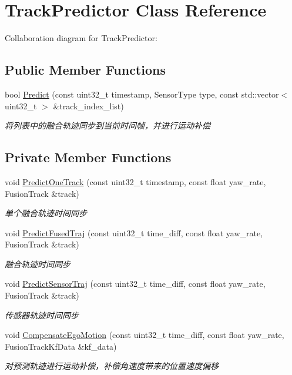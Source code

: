 \hypertarget{classTrackPredictor}{}\section{Track\+Predictor Class Reference}
\label{classTrackPredictor}


Collaboration diagram for Track\+Predictor\+:
\subsection*{Public Member Functions}
\begin{DoxyCompactItemize}
\item 
bool \hyperlink{classTrackPredictor_a2ffc9dfb459f575642e081f8c9f6786c}{Predict} (const uint32\+\_\+t timestamp, Sensor\+Type type, const std\+::vector$<$ uint32\+\_\+t $>$ \&track\+\_\+index\+\_\+list)
\begin{DoxyCompactList}\small\item\em 将列表中的融合轨迹同步到当前时间帧，并进行运动补偿 \end{DoxyCompactList}\end{DoxyCompactItemize}
\subsection*{Private Member Functions}
\begin{DoxyCompactItemize}
\item 
void \hyperlink{classTrackPredictor_a6fc935b0f86973ef65d66e0a5eead445}{Predict\+One\+Track} (const uint32\+\_\+t timestamp, const float yaw\+\_\+rate, Fusion\+Track \&track)
\begin{DoxyCompactList}\small\item\em 单个融合轨迹时间同步 \end{DoxyCompactList}\item 
void \hyperlink{classTrackPredictor_ad8a50ac75ddc8ba88127e7ef831d00ad}{Predict\+Fused\+Traj} (const uint32\+\_\+t time\+\_\+diff, const float yaw\+\_\+rate, Fusion\+Track \&track)
\begin{DoxyCompactList}\small\item\em 融合轨迹时间同步 \end{DoxyCompactList}\item 
void \hyperlink{classTrackPredictor_aec638c16c309f9b125c8510f78a3412a}{Predict\+Sensor\+Traj} (const uint32\+\_\+t time\+\_\+diff, const float yaw\+\_\+rate, Fusion\+Track \&track)
\begin{DoxyCompactList}\small\item\em 传感器轨迹时间同步 \end{DoxyCompactList}\item 
void \hyperlink{classTrackPredictor_abe38cd4b4a8bc34f947a53e1b89c36fe}{Compensate\+Ego\+Motion} (const uint32\+\_\+t time\+\_\+diff, const float yaw\+\_\+rate, Fusion\+Track\+Kf\+Data \&kf\+\_\+data)
\begin{DoxyCompactList}\small\item\em 对预测轨迹进行运动补偿，补偿角速度带来的位置速度偏移 \end{DoxyCompactList}\end{DoxyCompactItemize}
